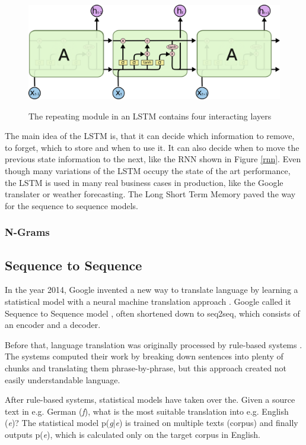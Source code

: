 \begin{figure}
	\begin{center}
		\includegraphics[width=4.5in]{photos/LSTM3-chain}\\
		\caption{The repeating module in an LSTM contains four interacting layers \cite{olah}}\label{lstm2}
	\end{center}
\end{figure}

The main idea of the LSTM is, that it can decide which information to remove, to forget, which to store and when to use it. It can also decide when to move the previous state information to the next, like the RNN shown in Figure \ref{rnn}. Even though many variations of the LSTM occupy the state of the art performance, the LSTM is used in many real business cases in production, like the Google translater or weather forecasting.
The Long Short Term Memory paved the way for the sequence to sequence models.
\subsubsection{N-Grams}\label{ss:ngram}

\subsection{Sequence to Sequence}\label{ss:seq2seq}
In the year 2014, Google invented a new way to translate language by learning a statistical model with a neural machine translation approach \cite{seq2seq}. Google called it Sequence to Sequence model \cite{seq2seq}, often shortened down to seq2seq, which consists of an encoder and a decoder. 

Before that, language translation was originally processed by rule-based systems \cite{chen-goodman}. The systems computed their work by breaking down sentences into plenty of chunks and translating them phrase-by-phrase, but this approach created not easily understandable language.

After rule-based systems, statistical models have taken over the. Given a source text in e.g. German (\textit{f}), what is the most suitable translation into e.g. English (\textit{e})? The statistical model p(\textit{g}|\textit{e}) is trained on multiple texts (corpus) and finally outputs p(\textit{e}), which is calculated only on the target corpus in English. 

